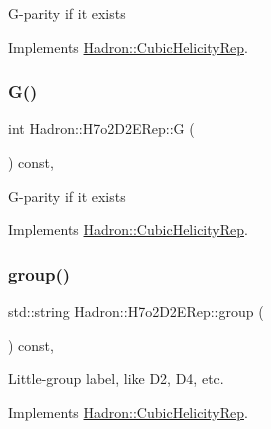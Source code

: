 G-\/parity if it exists 

Implements \mbox{\hyperlink{structHadron_1_1CubicHelicityRep_a50689f42be1e6170aa8cf6ad0597018b}{Hadron\+::\+Cubic\+Helicity\+Rep}}.

\mbox{\label{structHadron_1_1H7o2D2ERep_a6766559158a6095cb73ce82fcfd2de2e}} 
\subsubsection{\texorpdfstring{G()}{G()}\hspace{0.1cm}{\footnotesize\ttfamily [2/2]}}
{\footnotesize\ttfamily int Hadron\+::\+H7o2\+D2\+E\+Rep\+::G (\begin{DoxyParamCaption}{ }\end{DoxyParamCaption}) const\hspace{0.3cm}{\ttfamily [inline]}, {\ttfamily [virtual]}}

G-\/parity if it exists 

Implements \mbox{\hyperlink{structHadron_1_1CubicHelicityRep_a50689f42be1e6170aa8cf6ad0597018b}{Hadron\+::\+Cubic\+Helicity\+Rep}}.

\mbox{\label{structHadron_1_1H7o2D2ERep_a01d61c7d2d2ee0a909d40c5d43a90e09}} 
\subsubsection{\texorpdfstring{group()}{group()}\hspace{0.1cm}{\footnotesize\ttfamily [1/3]}}
{\footnotesize\ttfamily std\+::string Hadron\+::\+H7o2\+D2\+E\+Rep\+::group (\begin{DoxyParamCaption}{ }\end{DoxyParamCaption}) const\hspace{0.3cm}{\ttfamily [inline]}, {\ttfamily [virtual]}}

Little-\/group label, like D2, D4, etc. 

Implements \mbox{\hyperlink{structHadron_1_1CubicHelicityRep_a101a7d76cd8ccdad0f272db44b766113}{Hadron\+::\+Cubic\+Helicity\+Rep}}.

\mbox{\label{structHadron_1_1H7o2D2ERep_a01d61c7d2d2ee0a909d40c5d43a90e09}} 
